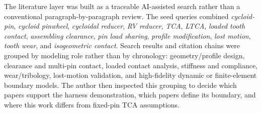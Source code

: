 \documentclass{article}
\begin{document}
\begin{tcolorbox}[colback=yellow!4!white,colframe=yellow!55!black,title=AI-Assisted Literature Collection Protocol,arc=4mm,boxrule=1pt]
\small
The literature layer was built as a traceable AI-assisted search rather than a conventional paragraph-by-paragraph review. The seed queries combined \emph{cycloid-pin}, \emph{cycloid pinwheel}, \emph{cycloidal reducer}, \emph{RV reducer}, \emph{TCA}, \emph{LTCA}, \emph{loaded tooth contact}, \emph{assembling clearance}, \emph{pin load sharing}, \emph{profile modification}, \emph{lost motion}, \emph{tooth wear}, and \emph{isogeometric contact}. Search results and citation chains were grouped by modeling role rather than by chronology: geometry/profile design, clearance and multi-pin contact, loaded contact analysis, stiffness and compliance, wear/tribology, lost-motion validation, and high-fidelity dynamic or finite-element boundary models. The author then inspected this grouping to decide which papers support the harness demonstration, which papers define its boundary, and where this work differs from fixed-pin TCA assumptions.
\end{tcolorbox}
\end{document}

